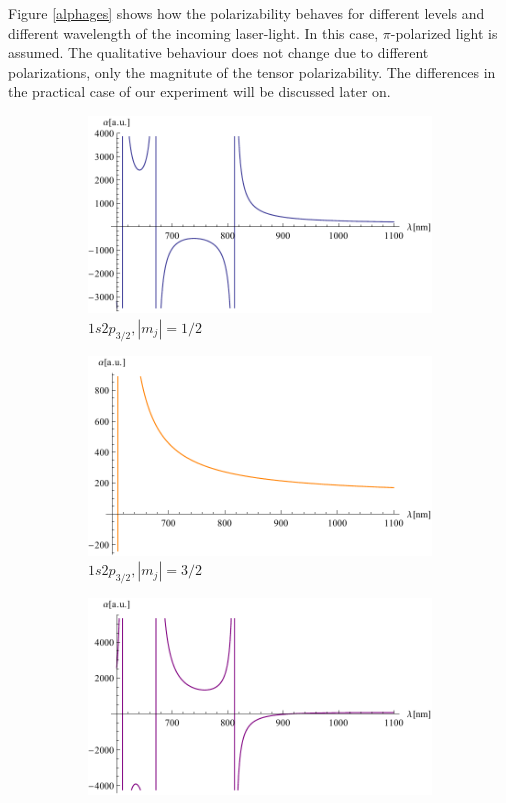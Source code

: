 Figure \ref{alphages} shows how the polarizability behaves for different levels and different wavelength of the incoming laser-light. In this case, $\pi$-polarized light is assumed. The qualitative behaviour does not change due to different polarizations, only the magnitute of the tensor polarizability. The differences in the practical case of our experiment will be discussed later on.
\begin{figure}[H]
\centering
\begin{subfigure}[b]{0.4\textwidth}
               \includegraphics[width=\textwidth]{alphaexited12}
                \caption{$1s2p_{3/2}, |m_j|=1/2$}
\end{subfigure}
\begin{subfigure}[b]{0.4\textwidth}
               \includegraphics[width=\textwidth]{alphaexited32}
                \caption{$1s2p_{3/2}, |m_j|=3/2$}
\end{subfigure}
\begin{subfigure}[b]{0.4\textwidth}
                \includegraphics[width=\textwidth]{alphadiff12}

\end{subfigure}
\end{figure}

